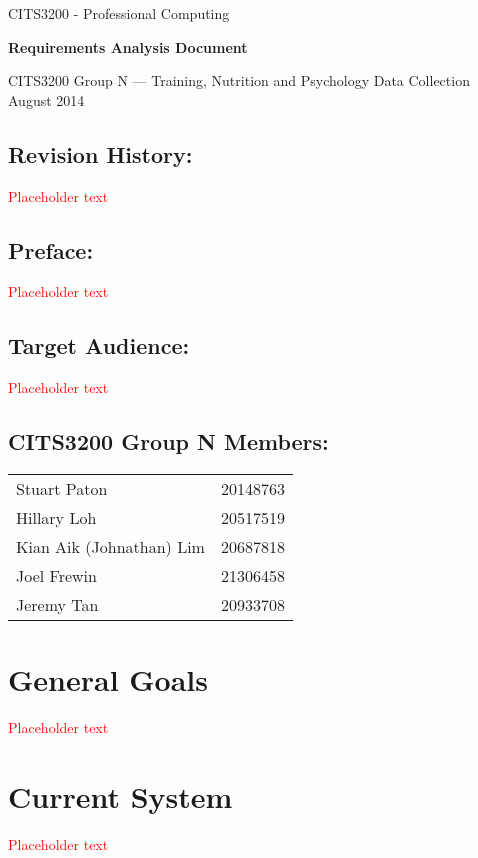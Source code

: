 \documentclass[a4paper, 11pt, titlepage]{article}
\begin{document}
\begin{center}
CITS3200 - Professional Computing\par
{\bf \Large Requirements Analysis Document} \par
CITS3200 Group N --- Training, Nutrition and Psychology Data Collection\\
August 2014
\end{center}

\subsection*{Revision History:}
\textcolor{red}{Placeholder text}

\subsection*{Preface:}
\textcolor{red}{Placeholder text}

\subsection*{Target Audience:}
\textcolor{red}{Placeholder text}

\subsection*{CITS3200 Group N Members:}
\begin{table}[H]
\centering
\begin{tabular}{ll}
	Stuart Paton & 20148763 \\
	Hillary Loh & 20517519 \\
	Kian Aik (Johnathan) Lim & 20687818 \\
	Joel Frewin & 21306458 \\
	Jeremy Tan & 20933708 \\
\end{tabular}
\end{table}

\pagebreak


\section{General Goals}
\textcolor{red}{Placeholder text}

\section{Current System}
\textcolor{red}{Placeholder text}
\end{document}
